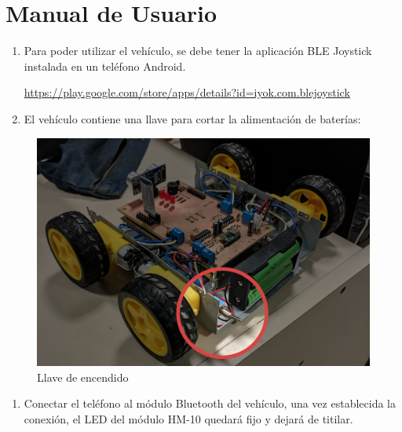 \section{Manual de Usuario}

\begin{enumerate}
\def\labelenumi{\arabic{enumi}.}
\item
  Para poder utilizar el vehículo, se debe tener la aplicación BLE
  Joystick instalada en un teléfono Android.
  
\url{https://play.google.com/store/apps/details?id=iyok.com.blejoystick}
\item
  El vehículo contiene una llave para cortar la alimentación de
  baterías:
\end{enumerate}

\begin{figure}[H]
\centering
\includegraphics[width=0.8\linewidth]{informe_4/llave.jpg}
\caption{Llave de encendido}
\end{figure}

\begin{enumerate}
\def\labelenumi{\arabic{enumi}.}
\setcounter{enumi}{2}
\tightlist
\item
Conectar el teléfono al módulo Bluetooth del vehículo, una vez establecida la conexión, el LED del módulo HM-10 quedará fijo y dejará de titilar.
\end{enumerate}
